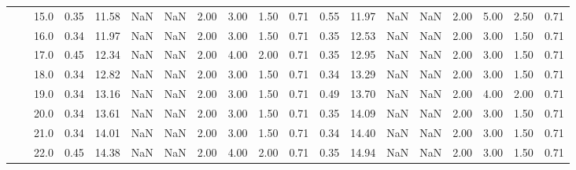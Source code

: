 \begin{tabular}{lllrrrrrrrrrrrrrrrr}
       &     & 15.0 &      0.35 &      11.58 &               NaN &                NaN & 2.00 &   3.00 &             1.50 &                         0.71 &      0.55 &      11.97 &               NaN &                NaN & 2.00 &   5.00 &             2.50 &                         0.71 \\
       &     & 16.0 &      0.34 &      11.97 &               NaN &                NaN & 2.00 &   3.00 &             1.50 &                         0.71 &      0.35 &      12.53 &               NaN &                NaN & 2.00 &   3.00 &             1.50 &                         0.71 \\
       &     & 17.0 &      0.45 &      12.34 &               NaN &                NaN & 2.00 &   4.00 &             2.00 &                         0.71 &      0.35 &      12.95 &               NaN &                NaN & 2.00 &   3.00 &             1.50 &                         0.71 \\
       &     & 18.0 &      0.34 &      12.82 &               NaN &                NaN & 2.00 &   3.00 &             1.50 &                         0.71 &      0.34 &      13.29 &               NaN &                NaN & 2.00 &   3.00 &             1.50 &                         0.71 \\
       &     & 19.0 &      0.34 &      13.16 &               NaN &                NaN & 2.00 &   3.00 &             1.50 &                         0.71 &      0.49 &      13.70 &               NaN &                NaN & 2.00 &   4.00 &             2.00 &                         0.71 \\
       &     & 20.0 &      0.34 &      13.61 &               NaN &                NaN & 2.00 &   3.00 &             1.50 &                         0.71 &      0.35 &      14.09 &               NaN &                NaN & 2.00 &   3.00 &             1.50 &                         0.71 \\
       &     & 21.0 &      0.34 &      14.01 &               NaN &                NaN & 2.00 &   3.00 &             1.50 &                         0.71 &      0.34 &      14.40 &               NaN &                NaN & 2.00 &   3.00 &             1.50 &                         0.71 \\
       &     & 22.0 &      0.45 &      14.38 &               NaN &                NaN & 2.00 &   4.00 &             2.00 &                         0.71 &      0.35 &      14.94 &               NaN &                NaN & 2.00 &   3.00 &             1.50 &                         0.71 \\

\end{tabular}
